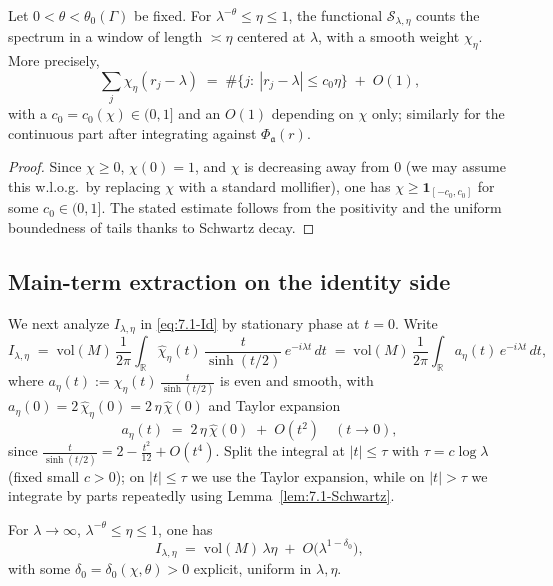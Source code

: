 \begin{proposition}\label{prop:7.1-window}
Let $0<\theta<\theta_0(\Gamma)$ be fixed. For $\lambda^{-\theta}\le \eta\le 1$, the functional $\mathcal{S}_{\lambda,\eta}$ counts the spectrum in a window of length $\asymp \eta$ centered at $\lambda$, with a smooth weight $\chi_\eta$. More precisely,
\[
  \sum_{j} \chi_\eta(r_j-\lambda) \;=\; \#\{j:\ |r_j-\lambda|\le c_0\eta\} \;+\; O(1),
\]
with a $c_0=c_0(\chi)\in(0,1]$ and an $O(1)$ depending on $\chi$ only; similarly for the continuous part after integrating against $\Phi_{\mathfrak{a}}(r)$.
\end{proposition}

\begin{proof}
Since $\chi\ge 0$, $\chi(0)=1$, and $\chi$ is decreasing away from $0$ (we may assume this w.l.o.g.\ by replacing $\chi$ with a standard mollifier), one has $\chi\ge \mathbf{1}_{[-c_0,c_0]}$ for some $c_0\in(0,1]$. The stated estimate follows from the positivity and the uniform boundedness of tails thanks to Schwartz decay.
\end{proof}

\subsection{Main-term extraction on the identity side} \label{subsec:7.1-identity-main}

We next analyze $I_{\lambda,\eta}$ in \eqref{eq:7.1-Id} by stationary phase at $t=0$. Write
\[
  I_{\lambda,\eta}
  \;=\; \mathrm{vol}(M)\,\frac{1}{2\pi}\int_{\mathbb{R}}
        \widehat{\chi}_\eta(t)\, \frac{t}{\sinh(t/2)}\, e^{-i\lambda t}\, dt
  \;=\; \mathrm{vol}(M)\,\frac{1}{2\pi}\int_{\mathbb{R}}
        a_\eta(t)\, e^{-i\lambda t}\, dt,
\]
where $a_\eta(t):=\widehat{\chi}_\eta(t)\, \frac{t}{\sinh(t/2)}$ is even and smooth, with $a_\eta(0)=2\,\widehat{\chi}_\eta(0)=2\,\eta\,\widehat{\chi}(0)$ and Taylor expansion
\[
  a_\eta(t) \;=\; 2\,\eta\,\widehat{\chi}(0) \;+\; O(t^2) \quad (t\to 0),
\]
since $\frac{t}{\sinh(t/2)}=2 - \frac{t^2}{12}+O(t^4)$. Split the integral at $|t|\le \tau$ with $\tau=c\log\lambda$ (fixed small $c>0$); on $|t|\le\tau$ we use the Taylor expansion, while on $|t|>\tau$ we integrate by parts repeatedly using Lemma~\ref{lem:7.1-Schwartz}.

\begin{lemma}\label{lem:7.1-SP}
For $\lambda\to\infty$, $\lambda^{-\theta}\le \eta\le 1$, one has
\[
  I_{\lambda,\eta} \;=\; \mathrm{vol}(M)\,\lambda\eta \;+\; O\!\big(\lambda^{1-\delta_0}\big),
\]
with some $\delta_0=\delta_0(\chi,\theta)>0$ explicit, uniform in $\lambda,\eta$.
\end{lemma}

